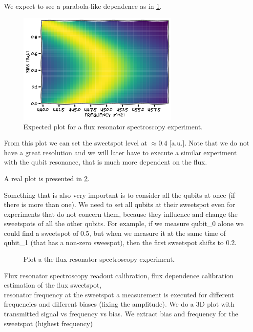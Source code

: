 We expect to see a parabola-like dependence as in \cref{fig:flux_resonator_spectroscopy_sketch}.
\begin{figure}[ht]
    \centering
    \includegraphics[width=8cm]{characterization/figures/resonator_spectroscopy_flux_sketch.pdf}
    \caption{Expected plot for a flux resonator spectroscopy experiment.}
    \label{fig:flux_resonator_spectroscopy_sketch}
\end{figure}
From this plot we can set the sweetspot level at $\approx 0.4$ [a.u.].
Note that we do not have a great resolution and we will later have to execute a similar experiment with the qubit resonance, that is much more dependent on the flux.

\noindent
A real plot is presented in \cref{fig:resonators_flux}.

Something that is also very important is to consider all the qubits at once (if there is more than one).
We need to set all qubits at their sweetspot even for experiments that do not concern them, because they influence and change the sweetspots of all the other qubits.
For example, if we measure qubit\_0 alone we could find a sweetspot of 0.5, but when we measure it at the same time of qubit\_1 (that has a non-zero sweespot), then the first sweetspot shifts to 0.2.

\begin{figure}[ht]
    \caption{Plot a the flux resonator spectroscopy experiment.}
    \label{fig:resonators_flux}
\end{figure}

\fluxexperimentrecap
{Flux resonator spectroscopy}
{readout calibration, flux dependence calibration}
{estimation of the flux sweetspot,\\resonator frequency at the sweetspot}
{a measurement is executed for different frequencies and different biases (fixing the amplitude). We do a 3D plot with transmitted signal vs frequency vs bias. We extract bias and frequency for the sweetspot (highest frequency)}
